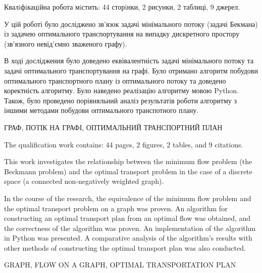 \abstractUkr
Квалiфiкацiйна робота мiстить: 44 сторiнки, 2 рисунки, 2 таблиці,
9 джерел.

У цій роботі було досліджено зв'язок задачі мінімального потоку (задачі Бекмана) із
задачею оптимального транспортування на випадку дискретного простору (зв'язного невід'ємно зваженого графу).

В ході дослідження було доведено еквівалентність задачі мінімального потоку та задачі оптимального транспортування
на графі. Було отримано алгоритм побудови оптимального транспортного плану із оптимального потоку та доведено коректність алгоритму.
Було наведено реалізацію алгоритму мовою Python. Також, було проведено порівняльний аналіз результатів роботи алгоритму з 
іншими методами побудови оптимального транспотного плану.

\MakeUppercase{ГРАФ, ПОТІК НА ГРАФІ, ОПТИМАЛЬНИЙ ТРАНСПОРТНИЙ ПЛАН}

\abstractEng
The qualification work contains: 44 pages, 2 figures, 2 tables, and 9 citations.

This work investigates the relationship between the minimum flow problem (the Beckmann problem) and 
the optimal transport problem in the case of a discrete space (a connected non-negatively weighted graph).

In the course of the research, the equivalence of the minimum flow problem and the optimal transport problem on a graph was proven. An algorithm for constructing an optimal transport plan from an optimal flow was obtained, and the correctness of the algorithm was proven.
An implementation of the algorithm in Python was presented. A comparative analysis of the algorithm's results with other
methods of constructing the optimal transport plan was also conducted.

\MakeUppercase{GRAPH, FLOW ON A GRAPH, OPTIMAL TRANSPORTATION PLAN}
\clearpage